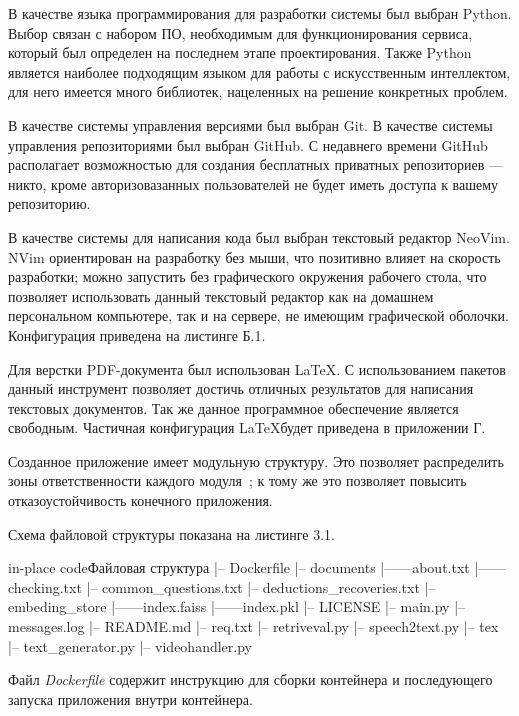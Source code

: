 
В качестве языка программирования для разработки системы был выбран Python. 
Выбор связан с набором ПО, необходимым для функционирования сервиса, который
был определен на последнем этапе проектирования. Также Python является
наиболее подходящим языком для работы с искусственным интеллектом, для
него имеется много библиотек, нацеленных на решение конкретных проблем.

В качестве системы управления версиями был выбран Git. В качестве системы 
управления репозиториями был выбран GitHub. С недавнего времени GitHub 
располагает возможностью для создания бесплатных приватных репозиториев ---
никто, кроме авторизовазанных пользователей не будет иметь доступа к вашему
репозиторию.

В качестве системы для написания кода был выбран текстовый редактор NeoVim.
NVim ориентирован на разработку без мыши, что позитивно влияет на скорость 
разработки; можно запустить без графического окружения рабочего стола, что
позволяет использовать данный текстовый редактор как на домашнем персональном
компьютере, так и на сервере, не имеющим графической оболочки. Конфигурация
приведена на листинге Б.1.

Для верстки PDF-документа был использован \LaTeX. С использованием пакетов
данный инструмент позволяет достичь отличных результатов для написания
текстовых документов. Так же данное программное обеспечение является свободным.
Частичная конфигурация \LaTeX будет приведена в приложении Г.

Созданное приложение имеет модульную структуру. Это позволяет распределить
зоны ответственности каждого модуля~\cite{solid}; к тому же это позволяет повысить 
отказоустойчивость конечного приложения. 

Схема файловой структуры показана на листинге 3.1.

\begin{codepiece}{in-place code}{Файловая структура}
|-- Dockerfile
|-- documents
|------about.txt
|------checking.txt
|--  common_questions.txt
|--  deductions_recoveries.txt
|-- embeding_store
|------index.faiss
|------index.pkl
|-- LICENSE
|-- main.py
|-- messages.log
|-- README.md
|-- req.txt
|-- retriveval.py
|-- speech2text.py
|-- tex
|-- text_generator.py
|-- videohandler.py
\end{codepiece}

Файл \emph{Dockerfile} содержит инструкцию для сборки контейнера и последующего
запуска приложения внутри контейнера.

